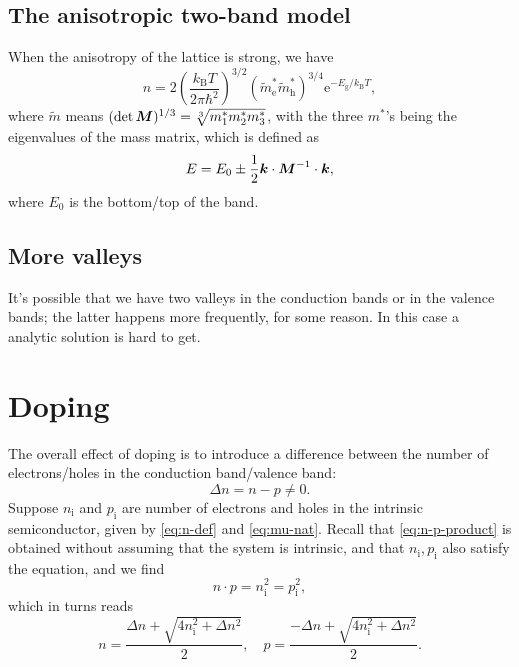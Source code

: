 \documentclass[hyperref, a4paper]{article}
\newcommand*{\ee}{\mathrm{e}}
\begin{document}
\subsection{The anisotropic two-band model}

When the anisotropy of the lattice is strong, we have 
\begin{equation}
    n = 2 \left( \frac{k_{\text{B}} T}{2 \pi \hbar^2} \right)^{3/2} (\tilde{m}_{\text{e}}^* \tilde{m}_{\text{h}}^*)^{3/4} \ee^{- E_{\text{g}} / k_{\text{B}} T},
\end{equation}
where $\tilde{m}$ means $(\det \vb*{M})^{1/3} = \sqrt[3]{m_1^* m_2^* m_3^*}$,
with the three $m^*$'s being the eigenvalues of the mass matrix,
which is defined as 
\begin{equation}
    E = E_0 \pm \frac{1}{2} \vb*{k} \cdot \vb*{M}^{-1} \cdot \vb*{k},
\end{equation}
where $E_0$ is the bottom/top of the band.

\subsection{More valleys}

It's possible that we have two valleys in the conduction bands
or in the valence bands; 
the latter happens more frequently, for some reason.
In this case a analytic solution is hard to get.

\section{Doping}

The overall effect of doping is to introduce a difference 
between the number of electrons/holes in the conduction band/valence band:
\begin{equation}
    \Delta n = n - p \neq 0.
\end{equation}
Suppose $n_{\text{i}}$ and $p_{\text{i}}$ are number of electrons and holes 
in the intrinsic semiconductor, 
given by \eqref{eq:n-def} and \eqref{eq:mu-nat}.
Recall that \eqref{eq:n-p-product} is obtained 
without assuming that the system is intrinsic,
and that $n_{\text{i}}, p_{\text{i}}$ also satisfy the equation,
and we find 
\begin{equation}
    n \cdot p = n_{\text{i}}^2 = p_{\text{i}}^2,
\end{equation}
which in turns reads  
\begin{equation}
    n = \frac{\Delta n + \sqrt{4 n_{\text{i}}^2 + \Delta n^2}}{2}, \quad 
    p = \frac{-\Delta n + \sqrt{4 n_{\text{i}}^2 + \Delta n^2}}{2}.
\end{equation}
\end{document}
